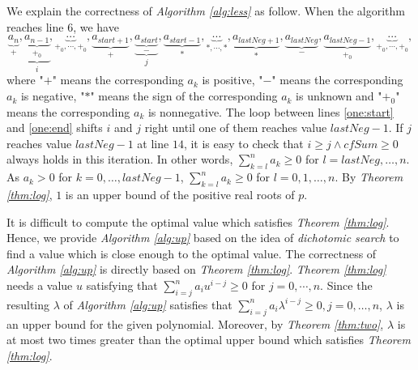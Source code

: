 We explain the correctness of {\em Algorithm \ref{alg:less}} as follow. When the algorithm reaches line $6$, we have \[\underbrace{a_n}_{+},\underbrace{\underbrace{a_{n-1}}_{+_0}}_{i},\underbrace{\cdots}_{+_0,\cdots,+_0},\underbrace{a_{start+1}}_{+},\underbrace{\underbrace{a_{start}}_{-}}_{j},\underbrace{a_{start-1}}_{*},\underbrace{\cdots}_{*,\cdots,*},\underbrace{a_{lastNeg+1}}_{*},\underbrace{a_{lastNeg}}_{-},\underbrace{a_{lastNeg-1}}_{+_0},\underbrace{\cdots}_{+_0,\cdots,+_0},\]
where "$+$" means the corresponding $a_k$ is positive, "$-$" means the corresponding $a_k$ is negative, "$*$" means the sign of the
corresponding $a_k$ is unknown and  "$+_0$" means the corresponding $a_k$ is nonnegative.
The loop between lines \ref{one:start} and \ref{one:end} shifts $i$ and $j$ right until one of them reaches value $lastNeg-1$. If $j$ reaches value $lastNeg-1$ at line $14$,  it is easy to check that $i\ge j\wedge cfSum\ge 0$ always holds in this iteration. In other words, $\sum_{k=l}^na_k\ge 0$ for $l=lastNeg,\ldots,n$. As $a_{k}>0$ for $k=0,\ldots, lastNeg-1$, $\sum_{k=l}^na_k\ge 0$ for $l=0,1,\ldots, n$. By {\em Theorem  \ref{thm:log}},  $1$ is an upper bound of the positive real roots of $p$.


It is difficult to compute the optimal value which satisfies {\em Theorem \ref{thm:log}}. Hence, we provide {\em Algorithm \ref{alg:up}} based on the idea of {\em dichotomic search} to find a value which is close enough to the optimal value. The correctness of {\em Algorithm \ref{alg:up}} is directly based on {\em Theorem \ref{thm:log}}.   {\em Theorem \ref{thm:log}} needs a value $u$ satisfying that  $ \sum_{i=j}^n a_i u^{i-j}\ge0$ for $j=0,\cdots, n$. Since the resulting  $\lambda$ of  {\em Algorithm \ref{alg:up}}   satisfies  that $\sum_{i=j}^n a_i \lambda^{i-j}\ge 0, j=0,\ldots,n$, $\lambda$ is an upper bound for the given polynomial. Moreover, by {\em Theorem \ref{thm:two}},	$\lambda$ is at most two times greater than the optimal upper bound which satisfies {\em Theorem \ref{thm:log}}.


